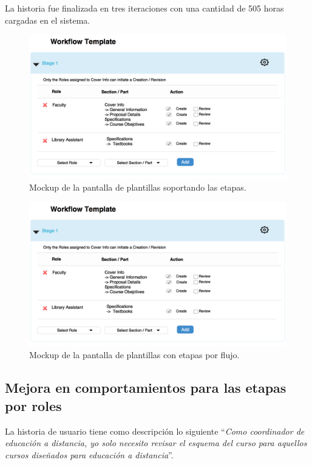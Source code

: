 La historia fue finalizada en tres iteraciones con una cantidad de 505 horas cargadas en el sistema.

\begin{figure}[H]
\centering
\includegraphics[width=125mm,scale=1]{Capitulos/DesarrollodelaAplicacion/Imagenes/workflow_stage}
\caption{Mockup de la pantalla de plantillas soportando las etapas.}
  \label{workflow_stage}
\end{figure}

\begin{figure}[H]
\centering
\includegraphics[width=125mm,scale=1]{Capitulos/DesarrollodelaAplicacion/Imagenes/workflow_stage}
\caption{Mockup de la pantalla de plantillas con etapas por flujo.}
  \label{workflow_template_stage}
\end{figure}

\subsection{Mejora en comportamientos para las etapas por roles}
La historia de usuario tiene como descripción lo siguiente \enquote{\textit{Como coordinador de educación a distancia, yo solo necesito revisar el esquema del curso para aquellos cursos diseñados para educación a distancia}}.


